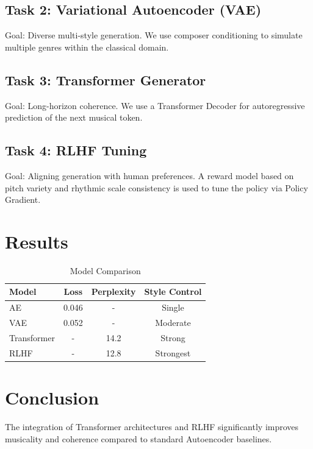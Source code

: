 \documentclass[conference]{IEEEtran}
\begin{document}
\subsection{Task 2: Variational Autoencoder (VAE)}
Goal: Diverse multi-style generation.
We use composer conditioning to simulate multiple genres within the classical domain.

\subsection{Task 3: Transformer Generator}
Goal: Long-horizon coherence.
We use a Transformer Decoder for autoregressive prediction of the next musical token.

\subsection{Task 4: RLHF Tuning}
Goal: Aligning generation with human preferences.
A reward model based on pitch variety and rhythmic scale consistency is used to tune the policy via Policy Gradient.

\section{Results}
\begin{table}[ht]
\centering
\caption{Model Comparison}
\begin{tabular}{|l|c|c|c|}
\hline
\textbf{Model} & \textbf{Loss} & \textbf{Perplexity} & \textbf{Style Control} \\ \hline
AE             & 0.046         & -                   & Single                  \\ \hline
VAE            & 0.052         & -                   & Moderate                \\ \hline
Transformer    & -             & 14.2                & Strong                  \\ \hline
RLHF           & -             & 12.8                & Strongest               \\ \hline
\end{tabular}
\end{table}

\section{Conclusion}
The integration of Transformer architectures and RLHF significantly improves musicality and coherence compared to standard Autoencoder baselines.
\end{document}
